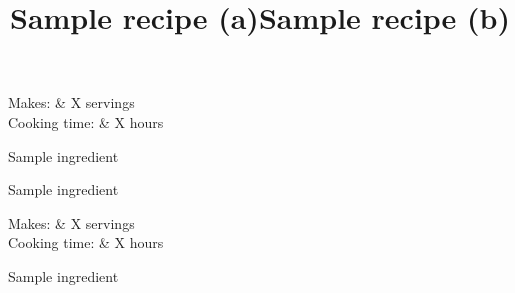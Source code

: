 \documentclass{RecipeBook}
\begin{document}
\title{Sample recipe (a)}

\begin{info}
	Makes: & X servings \\
	Cooking time: & X hours
\end{info}

\begin{ingredients}
	\item{Sample ingredient}
	\item{Sample ingredient}
\end{ingredients}



\pagebreak

\title{Sample recipe (b)}

\begin{info}
	Makes: & X servings \\
	Cooking time: & X hours
\end{info}

\begin{ingredients}
	\item{Sample ingredient}
\end{ingredients}


	
\clearpage
\end{document}
